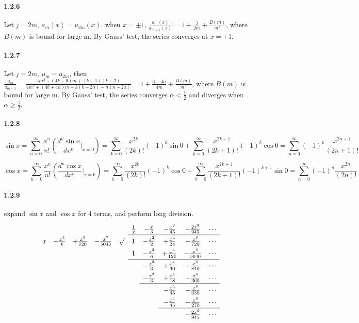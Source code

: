 \documentclass[a4paper]{article}
\begin{document}
\paragraph{1.2.6}
Let $j=2m$, $a_m(x)=u_{2m}(x)$. when $x=\pm1$,  $\frac{a_m(x)}{a_{m+1}(x)}=1+\frac{3}{2m}+\frac{B(m)}{m^2}$, where $B(m)$ is bound for large m. By Gauss' test, the series converges at $x=\pm1$.

\paragraph{1.2.7}
Let $j=2m$, $u_m=a_{2m}$, then $\frac{u_m}{u_{m+1}}=\frac{4m^2+(4k+6)m+(k+1)(k+2)}{4m^2+(4k+4\alpha)m+k(k+2\alpha)-n(n+2\alpha)}=1+\frac{6-4\alpha}{4m}+\frac{B(m)}{m^2}$, where $B(m)$ is bound for large m. By Gauss' test, the series converges $\alpha<\frac{1}{2}$ and diverges when $\alpha\geq\frac{1}{2}$.

\paragraph{1.2.8}
\[\sin x=\sum_{n=0}^\infty\frac{x^n}{n!}\left(\frac{d^n\sin{x}}{dx^n}\Big|_{x=0}\right)=\sum_{k=0}^\infty\frac{x^{2k}}{(2k)!}(-1)^k\sin{0}+\sum_{k=0}^\infty\frac{x^{2k+1}}{(2k+1)!}(-1)^k\cos{0}=\sum_{n=0}^\infty(-1)^n\frac{x^{2n+1}}{(2n+1)!}\]

\[\cos x=\sum_{n=0}^\infty\frac{x^n}{n!}\left(\frac{d^n\cos{x}}{dx^n}\Big|_{x=0}\right)=\sum_{k=0}^\infty\frac{x^{2k}}{(2k)!}(-1)^k\cos{0}+\sum_{k=0}^\infty\frac{x^{2k+1}}{(2k+1)!}(-1)^{k+1}\sin{0}=\sum_{n=0}^\infty(-1)^n\frac{x^{2n}}{(2n)!}\]

\paragraph{1.2.9}
expand $\sin{x}$ and $\cos{x}$ for 4 terms, and perform long division.
\[
\renewcommand{\arraystretch}{1.5}
\begin{array}{ccccccccccc}
& & & & & &\frac{1}{x} &-\frac{x}{3} &-\frac{x^3}{45} &-\frac{2x^5}{945} &\cdots \\
\cline{7-11}
&x &-\frac{x^3}{6} &+\frac{x^5}{120} &-\frac{x^7}{5040} &\surd &1 &-\frac{x^2}{2} &+\frac{x^4}{24} &-\frac{x^6}{720} &\cdots \\
& & & & & &1 &-\frac{x^2}{6} &+\frac{x^4}{120} &-\frac{x^6}{5040} &\cdots \\
\cline{7-11}
& & & & & & &-\frac{x^2}{3} &+\frac{x^4}{30} &-\frac{x^6}{840} &\cdots \\
& & & & & & &-\frac{x^2}{3} &+\frac{x^4}{18} &-\frac{x^6}{360} &\cdots \\
\cline{8-11}
& & & & & & & &-\frac{x^4}{45} &+\frac{x^6}{630} &\cdots \\
& & & & & & & &-\frac{x^4}{45} &+\frac{x^6}{270} &\cdots \\
\cline{9-11}
& & & & & & & & &-\frac{2x^6}{945} &\cdots \\
\end{array}
\]
\end{document}
